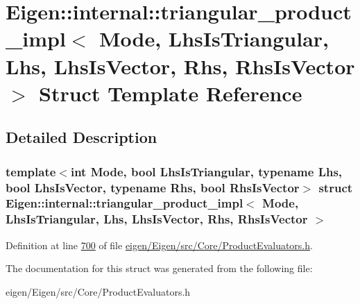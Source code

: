\hypertarget{struct_eigen_1_1internal_1_1triangular__product__impl}{}\section{Eigen\+:\+:internal\+:\+:triangular\+\_\+product\+\_\+impl$<$ Mode, Lhs\+Is\+Triangular, Lhs, Lhs\+Is\+Vector, Rhs, Rhs\+Is\+Vector $>$ Struct Template Reference}
\label{struct_eigen_1_1internal_1_1triangular__product__impl}


\subsection{Detailed Description}
\subsubsection*{template$<$int Mode, bool Lhs\+Is\+Triangular, typename Lhs, bool Lhs\+Is\+Vector, typename Rhs, bool Rhs\+Is\+Vector$>$\newline
struct Eigen\+::internal\+::triangular\+\_\+product\+\_\+impl$<$ Mode, Lhs\+Is\+Triangular, Lhs, Lhs\+Is\+Vector, Rhs, Rhs\+Is\+Vector $>$}



Definition at line \hyperlink{eigen_2_eigen_2src_2_core_2_product_evaluators_8h_source_l00700}{700} of file \hyperlink{eigen_2_eigen_2src_2_core_2_product_evaluators_8h_source}{eigen/\+Eigen/src/\+Core/\+Product\+Evaluators.\+h}.



The documentation for this struct was generated from the following file\+:\begin{DoxyCompactItemize}
\item 
eigen/\+Eigen/src/\+Core/\+Product\+Evaluators.\+h\end{DoxyCompactItemize}
